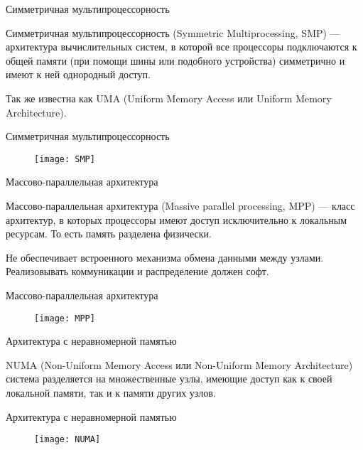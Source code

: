 \begin{frame}{Симметричная мультипроцессорность}

Симметричная мультипроцессорность (\abbr Symmetric Multiprocessing, SMP) --- архитектура вычислительных систем, в которой все процессоры подключаются к общей памяти (при помощи шины или подобного устройства) симметрично и имеют к ней однородный доступ.

Так же известна как UMA (Uniform Memory Access или Uniform Memory Architecture).

\end{frame}

\begin{frame}{Симметричная мультипроцессорность}

\begin{figure}[htp]
	\centering
	\texttt{[image: SMP]}
\end{figure}

\end{frame}

\begin{frame}{Массово-параллельная архитектура}

Массово-параллельная архитектура (\abbr Massive parallel processing, MPP) --- класс архитектур, в которых процессоры имеют доступ исключительно к локальным ресурсам. То есть память разделена физически.

Не обеспечивает встроенного механизма обмена данными между узлами. Реализовывать коммуникации и распределение должен софт.

\end{frame}

\begin{frame}{Массово-параллельная архитектура}

\begin{figure}[htp]
	\centering
	\texttt{[image: MPP]}
\end{figure}

\end{frame}

\begin{frame}{Архитектура с неравномерной памятью}

NUMA (Non-Uniform Memory Access или Non-Uniform Memory Architecture) система разделяется на множественные узлы, имеющие доступ как к своей локальной памяти, так и к памяти других узлов.

\end{frame}

\begin{frame}{Архитектура с неравномерной памятью}

\begin{figure}[htp]
	\centering
	\texttt{[image: NUMA]}
\end{figure}

\end{frame}

